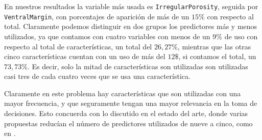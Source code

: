 En nuestros resultados la variable más usada es \texttt{IrregularPorosity}, seguida por \texttt{VentralMargin}, con porcentajes de aparición de más de un $15\%$ con respecto al total. Claramente podemos distinguir en dos grupos los predictores más y menos utilizados, ya que contamos con cuatro variables con menos de un $9\%$ de uso con respecto al total de características, un total del $26,27\%$, mientras que las otras cinco características cuentan con un uso de más del $12\$$, si contamos el total, un $73,73\%$. Es decir, solo la mitad de características son utilizadas son utilizadas casi tres de cada cuatro veces que se usa una característica.

Claramente en este problema hay características que son utilizadas con una mayor frecuencia, y que seguramente tengan una mayor relevancia en la toma de decisiones. Esto concuerda con lo discutido en el estado del arte, donde varias propuestas reducían el número de predictores utilizados de nueve a cinco, como en \cite{componentBased}.



\newpage
